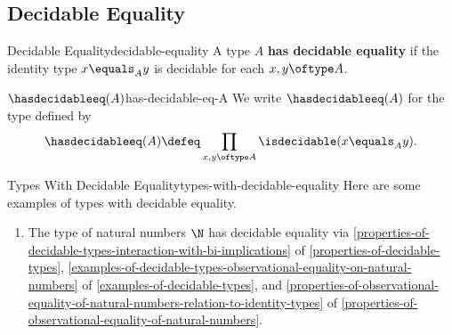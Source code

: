 \subsection{Decidable Equality}\label{subsection-decidable-equality}
\begin{definition}{Decidable Equality}{decidable-equality}%
    A type $A$ \textbf{has decidable equality} if the identity type $x\equals_{A}y$ is decidable for each $x,y\oftype A$.
\end{definition}
\begin{notation}{$\hasdecidableeq(A)$}{has-decidable-eq-A}%
    We write $\hasdecidableeq(A)$ for the type defined by
    \[
        \hasdecidableeq(A)%
        \defeq%
        \prod_{x,y\oftype A}\isdecidable(x\equals_{A}y).%
    \]%
\end{notation}
\begin{example}{Types With Decidable Equality}{types-with-decidable-equality}%
    Here are some examples of types with decidable equality.
    \begin{enumerate}
        \item\label{types-with-decidable-equality-the-natural-numbers}The type of natural numbers $\N$ has decidable equality via \cref{properties-of-decidable-types-interaction-with-bi-implications} of \cref{properties-of-decidable-types}, \cref{examples-of-decidable-types-observational-equality-on-natural-numbers} of \cref{examples-of-decidable-types}, and \cref{properties-of-observational-equality-of-natural-numbers-relation-to-identity-types} of \cref{properties-of-observational-equality-of-natural-numbers}.
    \end{enumerate}
\end{example}
\begin{appendices}

\end{appendices}


